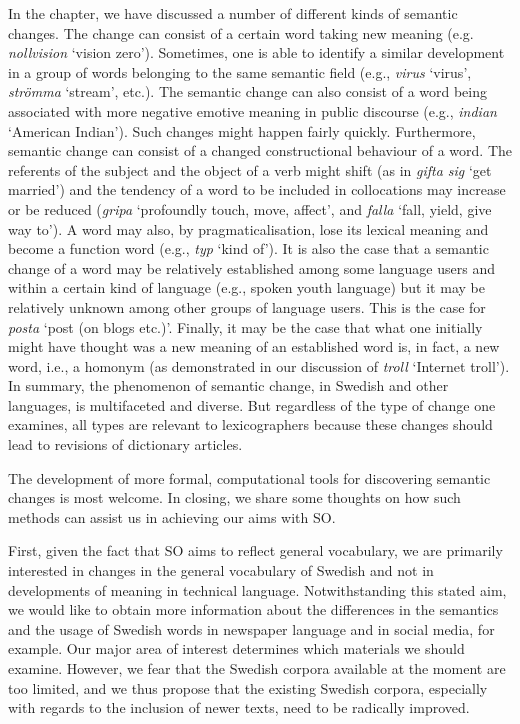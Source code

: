 \documentclass[output=paper]{langscibook}
\begin{document}
In the chapter, we have discussed a number of different kinds of semantic changes. The change can consist of a certain word taking new meaning (e.g. \emph{nollvision} `vision zero'). Sometimes, one is able to identify a similar development in a group of words belonging to the same semantic field (e.g., \emph{virus} `virus', \emph{strömma} `stream', etc.). The semantic change can also consist of a word being associated with more negative emotive meaning in public discourse (e.g., \emph{indian} `American Indian'). Such changes might happen fairly quickly. Furthermore, semantic change can consist of a changed constructional behaviour of a word. The referents of the subject and the object of a verb might shift (as in \emph{gifta sig} `get married') and the tendency of a word to be included in collocations may increase or be reduced (\emph{gripa} `profoundly touch, move, affect', and \emph{falla} `fall, yield, give way to'). A word may also, by pragmaticalisation, lose its lexical meaning and become a function word (e.g., \emph{typ} `kind of'). It is also the case that a semantic change of a word may be relatively established among some language users and within a certain kind of language (e.g., spoken youth language) but it may be relatively unknown among other groups of language users. This is the case for \emph{posta} `post (on blogs etc.)'. Finally, it may be the case that what one initially might have thought was a new meaning of an established word is, in fact, a new word, i.e., a homonym (as demonstrated in our discussion of \emph{troll} `Internet troll'). In summary, the phenomenon of semantic change, in Swedish and other languages, is multifaceted and diverse. But regardless of the type of change one examines, all types are relevant to lexicographers because these changes should lead to revisions of dictionary articles. 

The development of more formal, computational tools for discovering semantic changes is most welcome. In closing, we share some thoughts on how such methods can assist us in achieving our aims with SO.

First, given the fact that SO aims to reflect general vocabulary, we are primarily interested in changes in the general vocabulary of Swedish and not in developments of meaning in technical language. Notwithstanding this stated aim, we would like to obtain more information about the differences in the semantics and the usage of Swedish words in newspaper language and in social media, for example. Our major area of interest determines which materials we should examine. However, we fear that the Swedish corpora available at the moment are too limited, and we thus propose that the existing Swedish corpora, especially with regards to the inclusion of newer texts, need to be radically improved.
\end{document}
